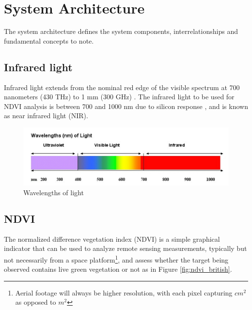 \chapter{System Architecture}

The system architecture defines the system components, interrelationships and fundamental concepts to note.

\section{Infrared light}

Infrared light extends from the nominal red edge of the visible spectrum at 700 nanometers (430 THz) to 1 mm (300 GHz) \cite{ir_wiki}. The infrared light to be used for NDVI analysis is between 700 and 1000 nm due to silicon response \cite{ir_wiki}, and is known as near infrared light (NIR).

\begin{figure}[H]
\centering
\includegraphics[scale=0.35]{images/ir_spectrum.png}
\caption{Wavelengths of light \cite{ir_spectrum}}
\label{fig:ir_spectrum}
\end{figure}

\section{NDVI}

The normalized difference vegetation index (NDVI) is a simple graphical indicator that can be used to analyze remote sensing measurements, typically but not necessarily from a space platform\footnote{Aerial footage will always be higher resolution, with each pixel capturing $cm^2$ as opposed to $m^2$}, and assess whether the target being observed contains live green vegetation or not\cite{ndvi_wiki} as in Figure \ref{fig:ndvi_british}.

